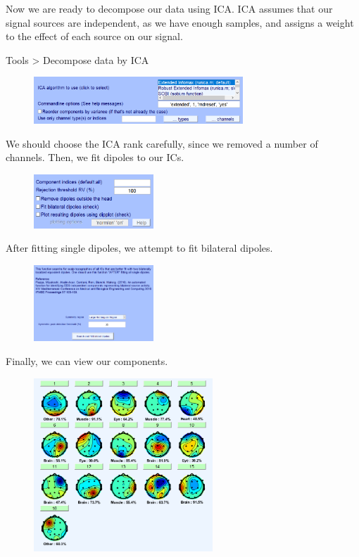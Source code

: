 \documentclass[hidelinks,12pt]{article}
\begin{document}
		Now we are ready to decompose our data using ICA. ICA assumes that our signal sources are independent, as we have enough samples, and assigns a weight to the effect of each source on our signal.
		
		Tools > Decompose data by ICA
		
		\begin{figure}[h!]
			\centering
			\includegraphics[width=0.7\textwidth]{21}
		\end{figure}
		
		We should choose the ICA rank carefully, since we removed a number of channels. Then, we fit dipoles to our ICs.
		
		\begin{figure}[h!]
			\centering
			\includegraphics[width=0.4\textwidth]{22}
		\end{figure}
				
		\newpage
		
		After fitting single dipoles, we attempt to fit bilateral dipoles.
		
		\begin{figure}[h!]
			\centering
			\includegraphics[width=0.4\textwidth]{23}
		\end{figure}
		
		Finally, we can view our components.
		
		\begin{figure}[h!]
			\centering
			\includegraphics[width=0.6\textwidth]{24}
		\end{figure}
		
\end{document}
